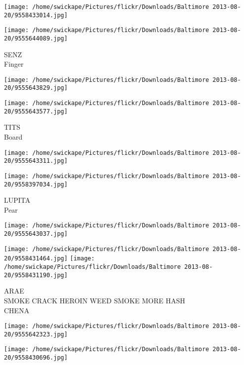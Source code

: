 \documentclass[10pt,letterpaper]{article}
\begin{document}
\texttt{[image: /home/swickape/Pictures/flickr/Downloads/Baltimore 2013-08-20/9558433014.jpg]}

\vspace{0.25in}
\texttt{[image: /home/swickape/Pictures/flickr/Downloads/Baltimore 2013-08-20/9555644089.jpg]}

SENZ\\
Finger\\
\pagebreak

\texttt{[image: /home/swickape/Pictures/flickr/Downloads/Baltimore 2013-08-20/9555643829.jpg]}

\vspace{0.25in}
\texttt{[image: /home/swickape/Pictures/flickr/Downloads/Baltimore 2013-08-20/9555643577.jpg]}

TITS\\
Board\\
\pagebreak

\texttt{[image: /home/swickape/Pictures/flickr/Downloads/Baltimore 2013-08-20/9555643311.jpg]}

\vspace{0.25in}
\texttt{[image: /home/swickape/Pictures/flickr/Downloads/Baltimore 2013-08-20/9558397034.jpg]}

LUPITA\\
Pear\\
\pagebreak

\texttt{[image: /home/swickape/Pictures/flickr/Downloads/Baltimore 2013-08-20/9555643037.jpg]}

\vspace{0.25in}
\texttt{[image: /home/swickape/Pictures/flickr/Downloads/Baltimore 2013-08-20/9558431464.jpg]}
\texttt{[image: /home/swickape/Pictures/flickr/Downloads/Baltimore 2013-08-20/9558431190.jpg]}

ARAE\\
SMOKE CRACK HEROIN WEED SMOKE MORE HASH\\
CHENA\\
\pagebreak

\texttt{[image: /home/swickape/Pictures/flickr/Downloads/Baltimore 2013-08-20/9555642323.jpg]}

\vspace{0.25in}
\texttt{[image: /home/swickape/Pictures/flickr/Downloads/Baltimore 2013-08-20/9558430696.jpg]}
\end{document}
